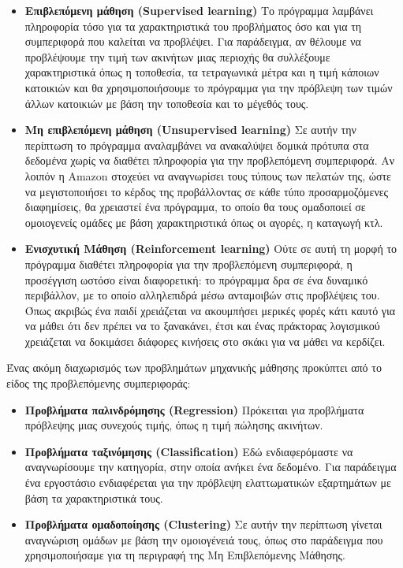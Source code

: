 \begin{itemize}
	\item \textbf{Επιβλεπόμενη μάθηση (Supervised learning)} Το πρόγραμμα λαμβάνει πληροφορία τόσο για τα χαρακτηριστικά του προβλήματος όσο και για τη συμπεριφορά που καλείται να προβλέψει. Για παράδειγμα, αν θέλουμε να προβλέψουμε την τιμή των ακινήτων μιας περιοχής θα συλλέξουμε χαρακτηριστικά όπως η τοποθεσία, τα τετραγωνικά μέτρα και η τιμή κάποιων κατοικιών και θα χρησιμοποιήσουμε το πρόγραμμα για την πρόβλεψη των τιμών άλλων κατοικιών με βάση την τοποθεσία και το μέγεθός τους.
	\item \textbf{Μη επιβλεπόμενη μάθηση (Unsupervised learning)} Σε αυτήν την περίπτωση το πρόγραμμα αναλαμβάνει να ανακαλύψει δομικά πρότυπα στα δεδομένα χωρίς να διαθέτει πληροφορία για την προβλεπόμενη συμπεριφορά. Αν λοιπόν η Amazon στοχεύει να αναγνωρίσει τους τύπους των πελατών της, ώστε να μεγιστοποιήσει το κέρδος της προβάλλοντας σε κάθε τύπο προσαρμοζόμενες διαφημίσεις, θα χρειαστεί ένα πρόγραμμα, το οποίο θα τους ομαδοποιεί σε ομοιογενείς ομάδες με βάση χαρακτηριστικά όπως οι αγορές, η καταγωγή κτλ.
	\item \textbf{Ενισχυτική Μάθηση (Reinforcement learning)} Ούτε σε αυτή τη μορφή το πρόγραμμα διαθέτει πληροφορία για την προβλεπόμενη συμπεριφορά, η προσέγγιση ωστόσο είναι διαφορετική: το πρόγραμμα δρα σε ένα δυναμικό περιβάλλον, με το οποίο αλληλεπιδρά μέσω ανταμοιβών στις προβλέψεις του. Όπως ακριβώς ένα παιδί χρειάζεται να ακουμπήσει μερικές φορές κάτι καυτό για να μάθει ότι δεν πρέπει να το ξανακάνει, έτσι και ένας πράκτορας λογισμικού χρειάζεται να δοκιμάσει διάφορες κινήσεις στο σκάκι για να μάθει να κερδίζει.
\end{itemize}

Ένας ακόμη διαχωρισμός των προβλημάτων μηχανικής μάθησης προκύπτει από το είδος της προβλεπόμενης συμπεριφοράς:

\begin{itemize}
	\item \textbf{Προβλήματα παλινδρόμησης (Regression)} Πρόκειται για προβλήματα πρόβλεψης μιας συνεχούς τιμής, όπως η τιμή πώλησης ακινήτων.
	\item \textbf{Προβλήματα ταξινόμησης (Classification)} Εδώ ενδιαφερόμαστε να αναγνωρίσουμε την κατηγορία, στην οποία ανήκει ένα δεδομένο. Για παράδειγμα ένα εργοστάσιο ενδιαφέρεται για την πρόβλεψη ελαττωματικών εξαρτημάτων με βάση τα χαρακτηριστικά τους.
	\item \textbf{Προβλήματα ομαδοποίησης (Clustering)} Σε αυτήν την περίπτωση γίνεται αναγνώριση ομάδων με βάση την ομοιογένειά τους, όπως στο παράδειγμα που χρησιμοποιήσαμε για τη περιγραφή της Μη Επιβλεπόμενης Μάθησης.
\end{itemize}

